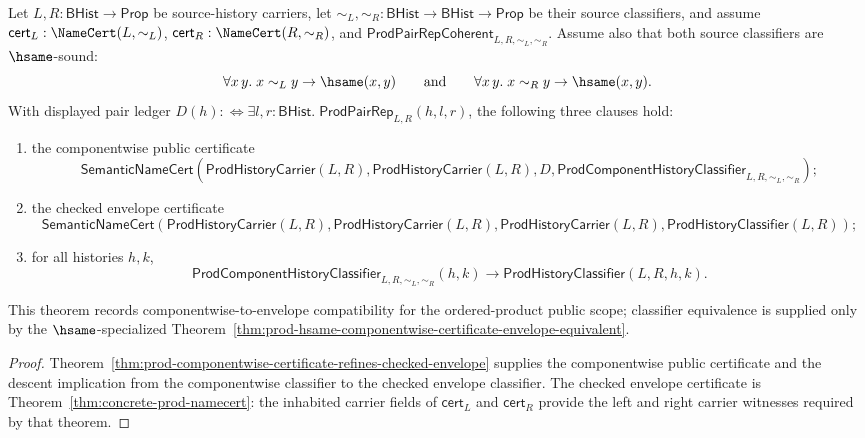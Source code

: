 \begin{theorem}
\label{thm:prod-public-object-scope-componentwise-envelope}
Let $L,R:\mathsf{BHist}\to\mathsf{Prop}$ be source-history carriers, let
$\sim_L,\sim_R:\mathsf{BHist}\to\mathsf{BHist}\to\mathsf{Prop}$ be their source
classifiers, and assume $\mathsf{cert}_L:\NameCert(L,\sim_L)$,
$\mathsf{cert}_R:\NameCert(R,\sim_R)$, and
$\mathsf{ProdPairRepCoherent}_{L,R,\sim_L,\sim_R}$. Assume also that both source
classifiers are $\hsame$-sound:
$$
\forall x\,y.\;x\sim_L y\to\hsame(x,y)
\qquad\hbox{and}\qquad
\forall x\,y.\;x\sim_R y\to\hsame(x,y).
$$
With displayed pair ledger
$D(h):\Longleftrightarrow
\exists l,r:\mathsf{BHist}.\;\mathsf{ProdPairRep}_{L,R}(h,l,r)$, the following
three clauses hold:
\begin{enumerate}
  \item the componentwise public certificate
  $$
  \mathsf{SemanticNameCert}(\mathsf{ProdHistoryCarrier}(L,R),
  \mathsf{ProdHistoryCarrier}(L,R),
  D,
  \mathsf{ProdComponentHistoryClassifier}_{L,R,\sim_L,\sim_R});
  $$
  \item the checked envelope certificate
  $$
  \mathsf{SemanticNameCert}(\mathsf{ProdHistoryCarrier}(L,R),
  \mathsf{ProdHistoryCarrier}(L,R),
  \mathsf{ProdHistoryCarrier}(L,R),
  \mathsf{ProdHistoryClassifier}(L,R));
  $$
  \item for all histories $h,k$,
  $$
  \mathsf{ProdComponentHistoryClassifier}_{L,R,\sim_L,\sim_R}(h,k)
  \to
  \mathsf{ProdHistoryClassifier}(L,R,h,k).
  $$
\end{enumerate}
This theorem records componentwise-to-envelope compatibility for the
ordered-product public scope; classifier equivalence is supplied only by the
$\hsame$-specialized Theorem~\ref{thm:prod-hsame-componentwise-certificate-envelope-equivalent}.
\end{theorem}
\begin{proof}
Theorem~\ref{thm:prod-componentwise-certificate-refines-checked-envelope}
supplies the componentwise public certificate and the descent implication from
the componentwise classifier to the checked envelope classifier. The checked
envelope certificate is Theorem~\ref{thm:concrete-prod-namecert}: the inhabited
carrier fields of $\mathsf{cert}_L$ and $\mathsf{cert}_R$ provide the left and
right carrier witnesses required by that theorem.
\end{proof}

